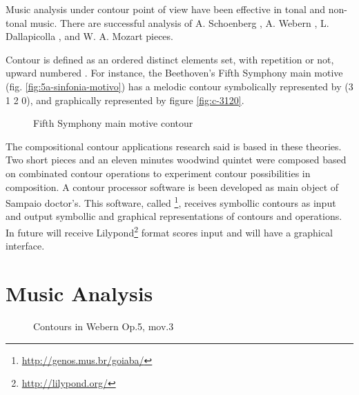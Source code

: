 Music analysis under contour point of view have been effective in
tonal and non-tonal music. There are successful analysis of A.
Schoenberg \cite{friedmann85:methodology}, A. Webern
\cite{clifford95:contour}, L. Dallapicolla
\cite{marvin88:generalized}, and W. A. Mozart \cite{beard03:contour}
pieces.

Contour is defined as an ordered distinct elements set, with
repetition or not, upward numbered \cite{morris93:directions}. For
instance, the Beethoven's Fifth Symphony main motive
(fig. \ref{fig:5a-sinfonia-motivo}) has a melodic contour symbolically
represented by (3 1 2 0), and graphically represented by figure
\ref{fig:c-3120}.

\begin{figure}[!p]
  \centering
  \subfloat[Contour (3 1 2 0)]{
    \texttt{[image: c-3120]}
    \label{fig:c-3120}
  }
  \caption{Fifth Symphony main motive contour}
  \label{fig:5a-sinfonia}
\end{figure}

The compositional contour applications research said is based in these
theories. Two short pieces and an eleven minutes woodwind quintet were
composed based on combinated contour operations to experiment contour
possibilities in composition. A contour processor software is been
developed as main object of Sampaio doctor's. This software, called
\goiaba{}\footnote{\url{http://genos.mus.br/goiaba/}}, receives
symbollic contours as input and output symbollic and graphical
representations of contours and operations. In future \goiaba{} will
receive Lilypond\footnote{\url{http://lilypond.org/}} format scores
input and will have a graphical interface.

\section{Music Analysis}
\label{sec:music-analysis}

\begin{figure}[!p]
  \centering

  \quad
  \caption{Contours in Webern Op.5, mov.3}
  \label{fig:exemplos-webern}
\end{figure}


